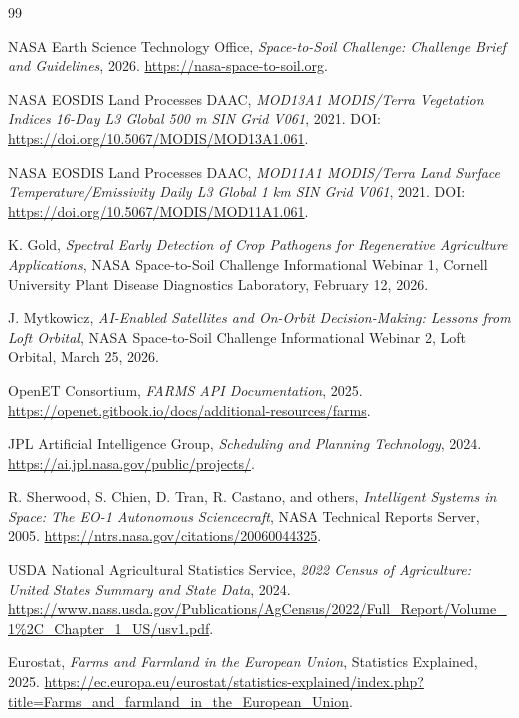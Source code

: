 \documentclass[11pt,letterpaper]{article}
\begin{document}
\clearpage
\footnotesize
\begin{thebibliography}{99}
\setlength{\itemsep}{0.1em}
\setlength{\parskip}{0pt}

NASA Earth Science Technology Office,
\emph{Space-to-Soil Challenge: Challenge Brief and Guidelines},
2026.
\url{https://nasa-space-to-soil.org}.

NASA EOSDIS Land Processes DAAC,
\emph{MOD13A1 MODIS/Terra Vegetation Indices 16-Day L3 Global 500 m SIN Grid V061},
2021.
DOI: \url{https://doi.org/10.5067/MODIS/MOD13A1.061}.

NASA EOSDIS Land Processes DAAC,
\emph{MOD11A1 MODIS/Terra Land Surface Temperature/Emissivity Daily L3 Global 1 km SIN Grid V061},
2021.
DOI: \url{https://doi.org/10.5067/MODIS/MOD11A1.061}.

K. Gold,
\emph{Spectral Early Detection of Crop Pathogens for Regenerative Agriculture Applications},
NASA Space-to-Soil Challenge Informational Webinar 1,
Cornell University Plant Disease Diagnostics Laboratory, February 12, 2026.

J. Mytkowicz,
\emph{AI-Enabled Satellites and On-Orbit Decision-Making: Lessons from Loft Orbital},
NASA Space-to-Soil Challenge Informational Webinar 2,
Loft Orbital, March 25, 2026.

OpenET Consortium,
\emph{FARMS API Documentation},
2025.
\url{https://openet.gitbook.io/docs/additional-resources/farms}.

JPL Artificial Intelligence Group,
\emph{Scheduling and Planning Technology},
2024.
\url{https://ai.jpl.nasa.gov/public/projects/}.

R. Sherwood, S. Chien, D. Tran, R. Castano, and others,
\emph{Intelligent Systems in Space: The EO-1 Autonomous Sciencecraft},
NASA Technical Reports Server, 2005.
\url{https://ntrs.nasa.gov/citations/20060044325}.

USDA National Agricultural Statistics Service,
\emph{2022 Census of Agriculture: United States Summary and State Data},
2024.
\url{https://www.nass.usda.gov/Publications/AgCensus/2022/Full_Report/Volume_1\%2C_Chapter_1_US/usv1.pdf}.

Eurostat,
\emph{Farms and Farmland in the European Union},
Statistics Explained, 2025.
\url{https://ec.europa.eu/eurostat/statistics-explained/index.php?title=Farms_and_farmland_in_the_European_Union}.


\end{thebibliography}
\end{document}
